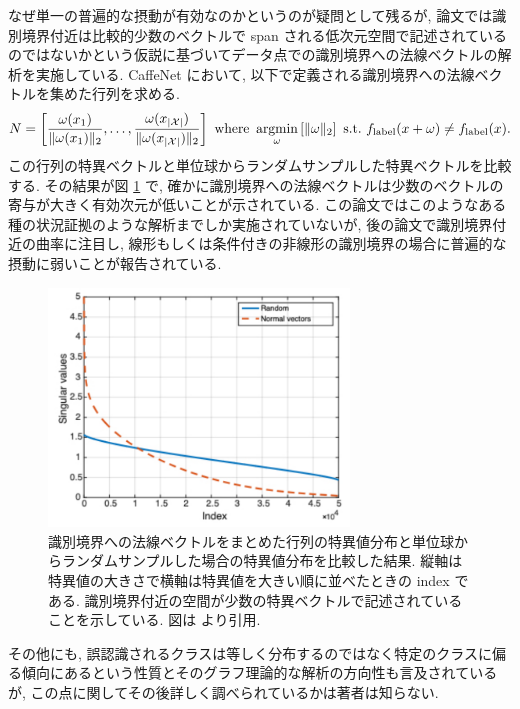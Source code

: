 なぜ単一の普遍的な摂動が有効なのかというのが疑問として残るが, 論文では識別境界付近は比較的少数のベクトルで span される低次元空間で記述されているのではないかという仮説に基づいてデータ点での識別境界への法線ベクトルの解析を実施している.
CaffeNet において, 以下で定義される識別境界への法線ベクトルを集めた行列を求める.
%
\begin{eqnarray}
N = \left[ \frac{\omega(x_1)}{\|\omega(x_1)\|_2}, \dots, \frac{\omega(x_{|\mathcal{X}|})}{\|\omega(x_{|\mathcal{X}|})\|_2} \right] \ \text{where} \ \argmin_{\omega} \left[ \|\omega\|_2 \right] \ \text{s.t.} \ f_{\text{label}} (x + \omega) \neq f_{\text{label}} (x).
\label{eq:universal-adversarial-normalvect}
\end{eqnarray}
%
この行列の特異ベクトルと単位球からランダムサンプルした特異ベクトルを比較する.
その結果が図 \ref{fig:universal-adversarial-singular-values} で, 確かに識別境界への法線ベクトルは少数のベクトルの寄与が大きく有効次元が低いことが示されている.
この論文ではこのようなある種の状況証拠のような解析までしか実施されていないが, 後の論文で識別境界付近の曲率に注目し, 線形もしくは条件付きの非線形の識別境界の場合に普遍的な摂動に弱いことが報告されている\cite{moosavi2017analysis}.
%
\begin{figure}[htbp]
\begin{center}
\includegraphics[width=8.0cm]{figures/universal-adversarial-singular-values.pdf}
\end{center}
\caption{
識別境界への法線ベクトルをまとめた行列の特異値分布と単位球からランダムサンプルした場合の特異値分布を比較した結果.
縦軸は特異値の大きさで横軸は特異値を大きい順に並べたときの index である.
識別境界付近の空間が少数の特異ベクトルで記述されていることを示している.
図は \cite{moosavi2017universal} より引用.
}
\label{fig:universal-adversarial-singular-values}
\end{figure}
%

その他にも, 誤認識されるクラスは等しく分布するのではなく特定のクラスに偏る傾向にあるという性質とそのグラフ理論的な解析の方向性も言及されているが, この点に関してその後詳しく調べられているかは著者は知らない.

